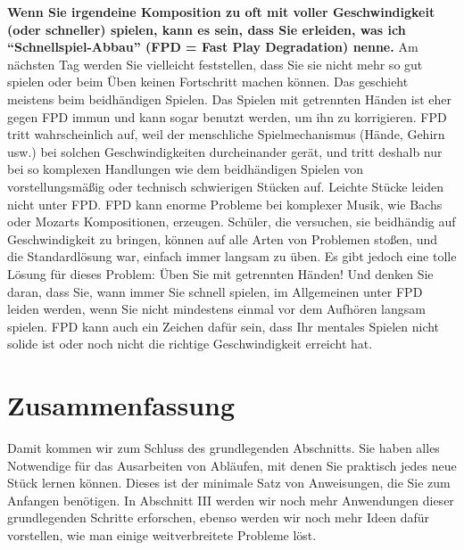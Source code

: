\hypertarget{fpd}{}

\textbf{Wenn Sie irgendeine Komposition zu oft mit voller Geschwindigkeit (oder schneller) spielen, kann es sein, dass Sie erleiden, was ich \enquote{Schnellspiel-Abbau} (FPD = Fast Play Degradation) nenne.}
Am nächsten Tag werden Sie vielleicht feststellen, dass Sie sie nicht mehr so gut spielen oder beim Üben keinen Fortschritt machen können.
Das geschieht meistens beim beidhändigen Spielen.
Das Spielen mit getrennten Händen ist eher gegen FPD immun und kann sogar benutzt werden, um ihn zu korrigieren.
FPD tritt wahrscheinlich auf, weil der menschliche Spielmechanismus (Hände, Gehirn usw.) bei solchen Geschwindigkeiten durcheinander gerät, und tritt deshalb nur bei so komplexen Handlungen wie dem beidhändigen Spielen von vorstellungsmäßig oder technisch schwierigen Stücken auf.
Leichte Stücke leiden nicht unter FPD.
FPD kann enorme Probleme bei komplexer Musik, wie Bachs oder Mozarts Kompositionen, erzeugen.
Schüler, die versuchen, sie beidhändig auf Geschwindigkeit zu bringen, können auf alle Arten von Problemen stoßen, und die Standardlösung war, einfach immer langsam zu üben.
Es gibt jedoch eine tolle Lösung für dieses Problem: Üben Sie mit getrennten Händen!
Und denken Sie daran, dass Sie, wann immer Sie schnell spielen, im Allgemeinen unter FPD leiden werden, wenn Sie nicht mindestens einmal vor dem Aufhören langsam spielen.
FPD kann auch ein Zeichen dafür sein, dass Ihr mentales Spielen nicht solide ist oder noch nicht die richtige Geschwindigkeit erreicht hat.


\section{Zusammenfassung}\hypertarget{c1ii26}{}

Damit kommen wir zum Schluss des grundlegenden Abschnitts.
Sie haben alles Notwendige für das Ausarbeiten von Abläufen, mit denen Sie praktisch jedes neue Stück lernen können.
Dieses ist der minimale Satz von Anweisungen, die Sie zum Anfangen benötigen.
In Abschnitt III werden wir noch mehr Anwendungen dieser grundlegenden Schritte erforschen, ebenso werden wir noch mehr Ideen dafür vorstellen, wie man einige weitverbreitete Probleme löst.





